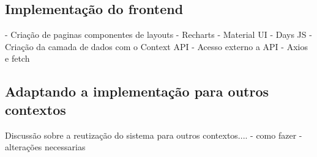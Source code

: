\subsection[Implementação do frontend]{Implementação do frontend}
- Criação de paginas componentes de layouts
- Recharts
- Material UI
- Days JS
- Criação da camada de dados com o Context API
- Acesso externo a API
- Axios e fetch

\subsection[Adaptando a implementação para outros contextos]{Adaptando a implementação para outros contextos}
Discussão sobre a reutização do sistema para outros contextos....
- como fazer
- alterações necessarias